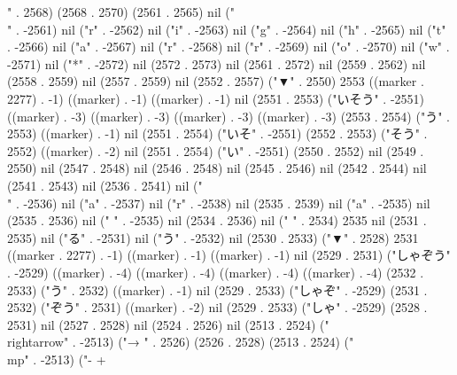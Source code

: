 " . 2568) (2568 . 2570) (2561 . 2565) nil ("\\" . -2561) nil ("r" . -2562) nil ("i" . -2563) nil ("g" . -2564) nil ("h" . -2565) nil ("t" . -2566) nil ("a" . -2567) nil ("r" . -2568) nil ("r" . -2569) nil ("o" . -2570) nil ("w" . -2571) nil ("*" . -2572) nil (2572 . 2573) nil (2561 . 2572) nil (2559 . 2562) nil (2558 . 2559) nil (2557 . 2559) nil (2552 . 2557) ("▼" . 2550) 2553 ((marker . 2277) . -1) ((marker) . -1) ((marker) . -1) nil (2551 . 2553) ("いそう" . -2551) ((marker) . -3) ((marker) . -3) ((marker) . -3) ((marker) . -3) (2553 . 2554) ("う" . 2553) ((marker) . -1) nil (2551 . 2554) ("いそ" . -2551) (2552 . 2553) ("そう" . 2552) ((marker) . -2) nil (2551 . 2554) ("い" . -2551) (2550 . 2552) nil (2549 . 2550) nil (2547 . 2548) nil (2546 . 2548) nil (2545 . 2546) nil (2542 . 2544) nil (2541 . 2543) nil (2536 . 2541) nil ("\\" . -2536) nil ("a" . -2537) nil ("r" . -2538) nil (2535 . 2539) nil ("a" . -2535) nil (2535 . 2536) nil (" " . -2535) nil (2534 . 2536) nil (" " . 2534) 2535 nil (2531 . 2535) nil ("る" . -2531) nil ("う" . -2532) nil (2530 . 2533) ("▼" . 2528) 2531 ((marker . 2277) . -1) ((marker) . -1) ((marker) . -1) nil (2529 . 2531) ("しゃぞう" . -2529) ((marker) . -4) ((marker) . -4) ((marker) . -4) ((marker) . -4) (2532 . 2533) ("う" . 2532) ((marker) . -1) nil (2529 . 2533) ("しゃぞ" . -2529) (2531 . 2532) ("ぞう" . 2531) ((marker) . -2) nil (2529 . 2533) ("しゃ" . -2529) (2528 . 2531) nil (2527 . 2528) nil (2524 . 2526) nil (2513 . 2524) ("\\rightarrow" . -2513) ("→
" . 2526) (2526 . 2528) (2513 . 2524) ("\\mp" . -2513) ("-
+
